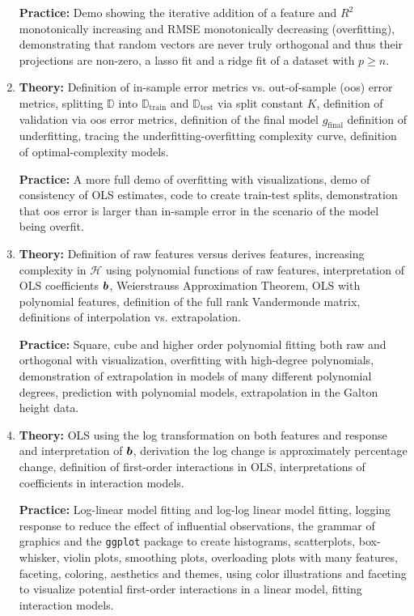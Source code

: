 \documentclass[12pt]{article}
\begin{document}
\begin{enumerate}[(1)]
\textbf{Practice:} Demo showing the iterative addition of a feature and $R^2$ monotonically increasing and RMSE monotonically decreasing (overfitting), demonstrating that random vectors are never truly orthogonal and thus their projections are non-zero, a lasso fit and a ridge fit of a dataset with $p \geq n$.

\item \textbf{Theory:} Definition of in-sample error metrics vs. out-of-sample (oos) error metrics, splitting $\mathbb{D}$ into $\mathbb{D}_{\text{train}}$ and $\mathbb{D}_{\text{test}}$ via split constant $K$, definition of  validation via oos error metrics, definition of the final model $g_{\text{final}}$ definition of underfitting, tracing the underfitting-overfitting complexity curve, definition of optimal-complexity models.

\textbf{Practice:} A more full demo of overfitting with visualizations, demo of consistency of OLS estimates, code to create train-test splits, demonstration that oos error is larger than in-sample error in the scenario of the model being overfit.

\item \textbf{Theory:} Definition of raw features versus derives features, increasing complexity in $\mathcal{H}$ using polynomial functions of raw features, interpretation of OLS coefficients $\boldsymbol{b}$, Weierstrauss Approximation Theorem, OLS with polynomial features, definition of the full rank Vandermonde matrix, definitions of interpolation vs. extrapolation.

\textbf{Practice:} Square, cube and higher order polynomial fitting both raw and orthogonal with visualization, overfitting with high-degree polynomials, demonstration of extrapolation in models of many different polynomial degrees, prediction with polynomial models, extrapolation in the Galton height data.

\item \textbf{Theory:} OLS using the log transformation on both features and response and interpretation of $\boldsymbol{b}$, derivation the log change is approximately percentage change, definition of first-order interactions in OLS, interpretations of coefficients in interaction models.

\textbf{Practice:} Log-linear model fitting and log-log linear model fitting, logging response to reduce the effect of influential observations, the grammar of graphics and the \texttt{ggplot} package to create histograms, scatterplots, box-whisker, violin plots, smoothing plots, overloading plots with many features, faceting, coloring, aesthetics and themes, using color illustrations and faceting to visualize potential first-order interactions in a linear model, fitting interaction models.


\end{enumerate}
\end{document}
